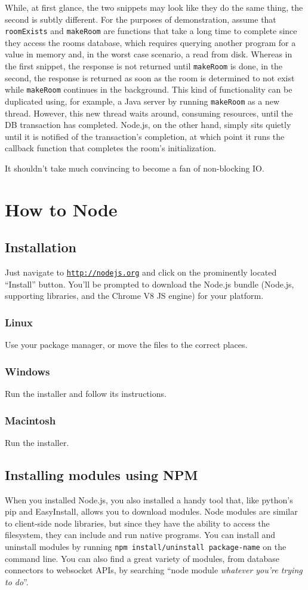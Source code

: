 \documentclass[12pt]{article}
\begin{document}
While, at first glance, the two snippets may look like they do the same thing, the second is subtly different. For the purposes of demonstration, assume that \texttt{roomExists} and \texttt{makeRoom} are functions that take a long time to complete since they access the rooms database, which requires querying another program for a value in memory and, in the worst case scenario, a read from disk. Whereas in the first snippet, the response is not returned until \texttt{makeRoom} is done, in the second, the response is returned as soon as the room is determined to not exist while \texttt{makeRoom} continues in the background. This kind of functionality can be duplicated using, for example, a Java server by running \texttt{makeRoom} as a new thread. However, this new thread waits around, consuming resources, until the DB transaction has completed. Node.js, on the other hand, simply sits quietly until it is notified of the transaction's completion, at which point it runs the callback function that completes the room's initialization.
\par
It shouldn't take much convincing to become a fan of non-blocking IO.

\section{How to Node}

\subsection{Installation}
Just navigate to \underline{\texttt{http://nodejs.org}} and click on the prominently located ``Install'' button. You'll be prompted to download the Node.js bundle (Node.js, supporting libraries, and the Chrome V8 JS engine) for your platform.
\subsubsection*{Linux}
Use your package manager, or move the files to the correct places.
\subsubsection*{Windows}
Run the installer and follow its instructions. 
\subsubsection*{Macintosh}
Run the installer.

\subsection{Installing modules using NPM}
When you installed Node.js, you also installed a handy tool that, like python's pip and EasyInstall, allows you to download modules. Node modules are similar to client-side node libraries, but since they have the ability to access the filesystem, they can include and run native programs. You can install and uninstall modules by running \texttt{npm install/uninstall package-name} on the command line. You can also find a great variety of modules, from database connectors to websocket APIs, by searching ``node module \emph{whatever you're trying to do}''.
\end{document}
